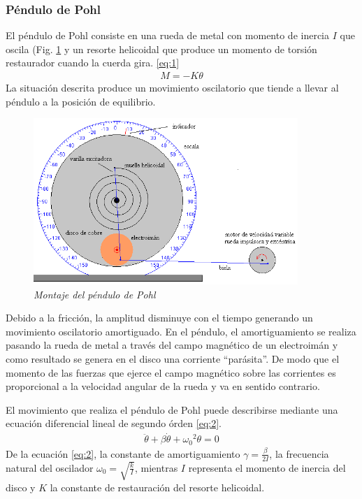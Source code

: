 \documentclass[spanish,notitlepage,letterpaper, 12pt]{article}
\begin{document}
\subsubsection{Péndulo de Pohl}
El péndulo de Pohl consiste en una rueda de metal con momento de inercia $I$ que
oscila (Fig. \ref{fig:1} y un resorte helicoidal que produce un momento de torsión restaurador cuando la cuerda gira. \eqref{eq:1}
\begin{align}\label{eq:1}
    M=-K\theta
\end{align}
La situación descrita produce un movimiento oscilatorio que tiende a llevar al péndulo a la posición de equilibrio.
\newpage
\begin{figure}[ht]
    \centering
    \includegraphics[width=10.0cm]{images/pendulo-pohl.png}
    \caption{\textit{Montaje del péndulo de Pohl}}
    \label{fig:1}
\end{figure}
Debido a la fricción, la amplitud disminuye con el tiempo generando un movimiento oscilatorio amortiguado. En el péndulo, el amortiguamiento se realiza pasando la rueda de metal a través del campo magnético de un electroimán y como resultado se genera en el disco una corriente ``parásita''. De modo
que el momento de las fuerzas que ejerce el campo magnético sobre las corrientes es proporcional a la velocidad angular de la rueda y va en sentido contrario.\par
\bigskip
El movimiento que realiza el péndulo de Pohl puede describirse mediante una ecuación diferencial lineal de segundo órden \eqref{eq:2}. \cite{serway_jewett_2017}
\begin{align}\label{eq:2}
    \ddot{\theta}+\beta\dot{\theta}+{\omega_0}^2\theta=0
\end{align}
De la ecuación \eqref{eq:2}, la constante de amortiguamiento $\gamma=\frac{\beta}{2I}$, la frecuencia natural del oscilador $\omega_0=\sqrt{\frac{k}{I}}$, mientras $I$ representa el momento de inercia del disco y $K$ la constante de restauración del resorte helicoidal.\par
\end{document}
